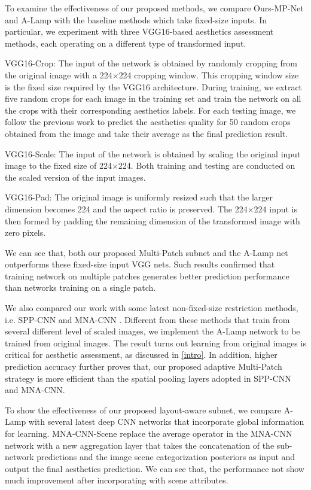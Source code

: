 \documentclass[10pt,twocolumn,letterpaper]{article}
\begin{document}
To examine the effectiveness of our proposed methods, we compare Ours-MP-Net and A-Lamp with the baseline methods which take fixed-size inputs. In particular, we experiment with three VGG16-based aesthetics assessment methods, each operating on a different type of transformed input.

VGG16-Crop: The input of the network is obtained by randomly cropping from the original image with a 224$\times$224 cropping window. This cropping window size is the fixed size required by the VGG16 architecture. During training, we extract five random crops for each image in the training
set and train the network on all the crops with their corresponding
aesthetics labels. For each testing image, we follow the previous work \cite{Lu:2015:ICCV} to predict the aesthetics quality for 50 random crops obtained from the image and take their average as the final prediction result.

VGG16-Scale: The input of the network is obtained by scaling
the original input image to the fixed size of 224$\times$224. Both training and testing are conducted on the scaled version of the input images.

VGG16-Pad: The original image is uniformly resized such that the larger dimension becomes 224 and the aspect ratio is preserved. The 224$\times$224 input is then formed by padding the remaining dimension of the transformed image with zero pixels.

We can see that, both our proposed Multi-Patch subnet and the A-Lamp net outperforms these fixed-size input VGG nets. Such results confirmed that training network on multiple patches generates better prediction performance than networks training on a single patch.

We also compared our work with some latest non-fixed-size restriction methods, i.e. SPP-CNN \cite{He:archive:2014} and MNA-CNN \cite{Mai:2016:CVPR}.  Different from these methods that train from several different level of scaled images, we implement the A-Lamp network to be trained from original images. The result turns out learning from original images is critical for aesthetic assessment, as discussed in \ref{intro}. In addition, higher prediction accuracy further proves that, our proposed adaptive Multi-Patch strategy is more efficient than the spatial pooling layers adopted in SPP-CNN and MNA-CNN.

To show the effectiveness of our proposed layout-aware subnet, we compare A-Lamp with several latest deep CNN networks that incorporate global information for learning. MNA-CNN-Scene \cite{Mai:2016:CVPR} replace the average operator in the MNA-CNN network with a new aggregation layer that takes the concatenation of the sub-network predictions and the image scene categorization posteriors as input and output the final aesthetics prediction. We can see that, the performance not show much improvement after incorporating with scene attributes. 
\end{document}
